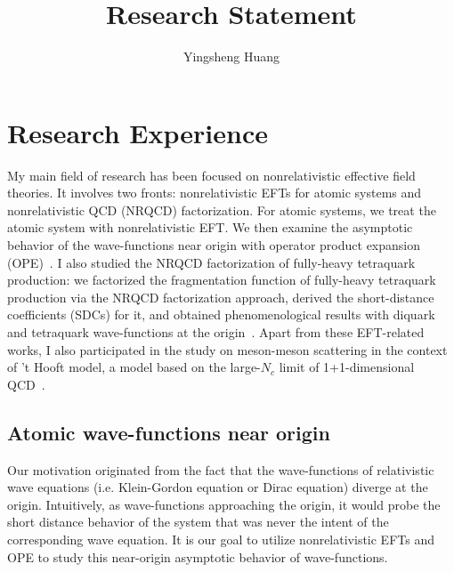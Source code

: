\documentclass[letterpaper,11pt]{article}
\title{Research Statement}
\author{Yingsheng Huang}
\date{}
\begin{document}
	\maketitle


	\section*{Research Experience}
	My main field of research has been focused on nonrelativistic effective field theories. It involves two fronts: nonrelativistic EFTs for atomic systems and nonrelativistic QCD (NRQCD) factorization. For atomic systems, we treat the atomic system with nonrelativistic EFT. We then examine the asymptotic behavior of the wave-functions near origin with operator product expansion (OPE)~\cite{Huang2018,Huang2018a,Huang2019}. I also studied the NRQCD factorization of fully-heavy tetraquark production: we factorized the fragmentation function of fully-heavy tetraquark production via the NRQCD factorization approach, derived the short-distance coefficients (SDCs) for it, and obtained phenomenological results with diquark and tetraquark wave-functions at the origin~\cite{Feng2020}. Apart from these EFT-related works, I also participated in the study on meson-meson scattering in the context of 't Hooft model, a model based on the large-$N_c$ limit of 1+1-dimensional QCD~\cite{Chen2019}. 
	\subsection*{Atomic wave-functions near origin}
	Our motivation originated from the fact that the wave-functions of relativistic wave equations (i.e. Klein-Gordon equation or Dirac equation) diverge at the origin. Intuitively, as wave-functions approaching the origin, it would probe the short distance behavior of the system that was never the intent of the corresponding wave equation. It is our goal to utilize nonrelativistic EFTs and OPE to study this near-origin asymptotic behavior of wave-functions. 
\end{document}
